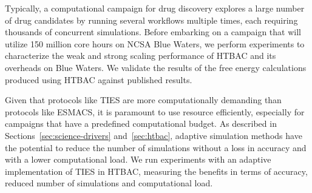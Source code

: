 Typically, a computational campaign for drug discovery explores a large
number of drug candidates by running several workflows multiple times, each
requiring thousands of concurrent simulations. Before embarking on a campaign
that will utilize 150 million core hours on NCSA Blue Waters, we perform
experiments to characterize the weak and strong scaling performance of HTBAC
and its overheads on Blue Waters. We validate the results of the free energy
calculations produced using HTBAC against published results.

Given that protocols like TIES are more computationally demanding than
protocols like ESMACS, it is paramount to use resource efficiently,
especially for campaigns that have a predefined computational budget. As
described in Sections~\ref{sec:science-drivers} and~\ref{sec:htbac}, adaptive
simulation methods have the potential to reduce the number of simulations
without a loss in accuracy and with a lower computational load. We run
experiments with an adaptive implementation of TIES in HTBAC, measuring the
benefits in terms of accuracy, reduced number of simulations and
computational load.





